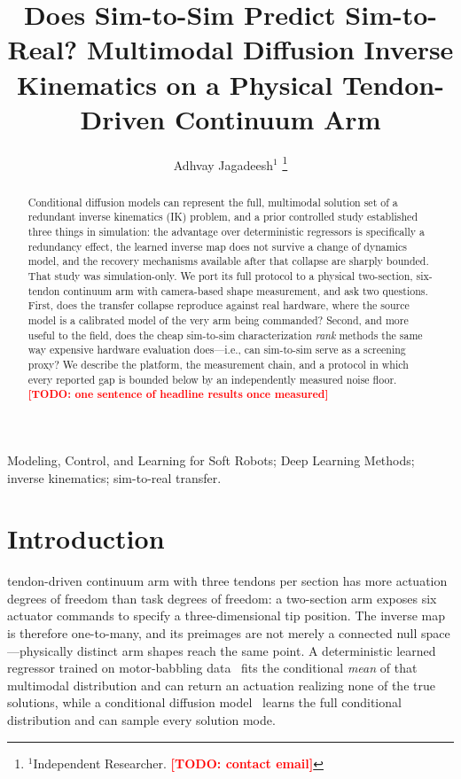\documentclass[letterpaper, 10pt, conference]{ieeeconf}
\providecommand{\IEEEPARstart}[2]{\PARstart{#1}{#2}}
\newif\ifanonymous
\newcommand{\todo}[1]{\textcolor{red}{\textbf{[TODO: #1]}}}
\newcommand{\ie}{i.e.}
\begin{document}
\title{\LARGE \bf Does Sim-to-Sim Predict Sim-to-Real? Multimodal Diffusion
Inverse Kinematics on a Physical Tendon-Driven Continuum Arm}

\ifanonymous
\author{Anonymous submission}
\else
\author{Adhvay Jagadeesh$^{1}$
\thanks{$^{1}$Independent Researcher. \todo{contact email}}}
\fi

\maketitle
\thispagestyle{empty}
\pagestyle{empty}

\begin{abstract}
Conditional diffusion models can represent the full, multimodal solution set
of a redundant inverse kinematics (IK) problem, and a prior controlled study
established three things in simulation: the advantage over deterministic
regressors is specifically a redundancy effect, the learned inverse map does
not survive a change of dynamics model, and the recovery mechanisms available
after that collapse are sharply bounded. That study was simulation-only. We
port its full protocol to a physical two-section, six-tendon continuum arm
with camera-based shape measurement, and ask two questions. First, does the
transfer collapse reproduce against real hardware, where the source model is
a calibrated model of the very arm being commanded? Second, and more useful
to the field, does the cheap sim-to-sim characterization \emph{rank} methods
the same way expensive hardware evaluation does---\ie, can sim-to-sim serve
as a screening proxy? We describe the platform, the measurement chain, and a
protocol in which every reported gap is bounded below by an independently
measured noise floor.
\todo{one sentence of headline results once measured}
\end{abstract}

\begin{keywords}
Modeling, Control, and Learning for Soft Robots; Deep Learning Methods;
inverse kinematics; sim-to-real transfer.
\end{keywords}

\section{Introduction}

\IEEEPARstart{A}{} tendon-driven continuum arm with three tendons per section
has more actuation degrees of freedom than task degrees of freedom: a
two-section arm exposes six actuator commands to specify a three-dimensional
tip position. The inverse map is therefore one-to-many, and its preimages are
not merely a connected null space---physically distinct arm shapes reach the
same point. A deterministic learned regressor trained on motor-babbling
data~\cite{giorelli2015neural} fits the conditional \emph{mean} of that
multimodal distribution and can return an actuation realizing none of the
true solutions, while a conditional diffusion
model~\cite{ho2020denoising,song2021denoising} learns the full conditional
distribution and can sample every solution mode.
\end{document}
